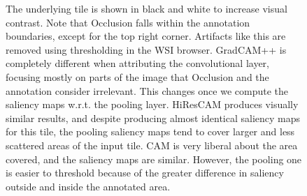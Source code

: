 \begin{figure}
\begin{center}
{    The underlying tile is shown in black and white to increase visual contrast.
    Note that Occlusion falls within the annotation boundaries, except for the top right corner.
    Artifacts like this are removed using thresholding in the WSI browser.
    GradCAM++ is completely different when attributing the convolutional layer, focusing mostly on parts of the image that Occlusion and the annotation consider irrelevant.
    This changes once we compute the saliency maps w.r.t. the pooling layer.
    HiResCAM produces visually similar results, and despite producing almost identical saliency maps for this tile, the pooling saliency maps tend to cover larger and less scattered areas of the input tile.
    CAM is very liberal about the area covered, and the saliency maps are similar.
    However, the pooling one is easier to threshold because of the greater difference in saliency outside and inside the annotated area.
    }
    \label{fig:conv-vs-pool}
    \end{center}
\end{figure}

